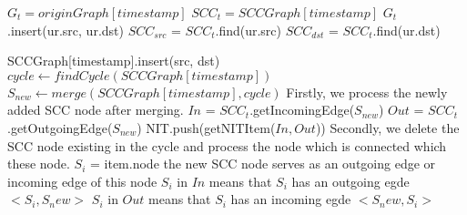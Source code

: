 \documentclass{article}
\begin{document}
    \State $G_{t} = originGraph[timestamp]$
    \State $SCC_{t} = SCCGraph[timestamp]$
        \State {}
    \EndIf
        \State {}
    \EndIf
    \State $G_t$.insert(ur.src, ur.dst)
    \State $SCC_{src}$ = $SCC_t$.find(ur.src)
    \State $SCC_{dst}$ = $SCC_t$.find(ur.dst)

        \State \Return
    \Else
        \State SCCGraph[timestamp].insert(src, dst)
        \State $cycle \gets findCycle(SCCGraph[timestamp])$
            \State $S_{new} \gets merge(SCCGraph[timestamp], cycle)$
            \State \Comment Firstly, we process the newly added SCC node after merging.
            \State $In$ = $SCC_t$.getIncomingEdge($S_{new}$)
            \State $Out$ = $SCC_t$.getOutgoingEdge($S_{new}$)
            \Else 
                \State NIT.push(getNITItem($In, Out$)) 
            \EndIf
            \State \Comment Secondly, we delete the SCC node existing in the cycle and process the node which is connected which these node.
                \State $S_i$ = item.node
                    \State \Comment the new SCC node serves as an outgoing edge or incoming edge  of this node
                    \State \Comment $S_i$ in $In$ means that $S_i$ has an outgoing egde $<S_i, S_new>$
                    \EndIf
                    \State \Comment $S_i$ in $Out$ means that $S_i$ has an incoming egde $<S_new, S_i>$
                    \EndIf
                \Else 
                \EndIf  
            \EndFor
        \EndWhile

    \EndIf
\EndFunction
\end{document}
